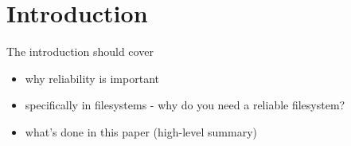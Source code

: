 \section{Introduction}
The introduction should cover

\begin{itemize}
  \item why reliability is important
  \item specifically in filesystems - why do you need a reliable filesystem?
  \item what's done in this paper (high-level summary)
\end{itemize}
